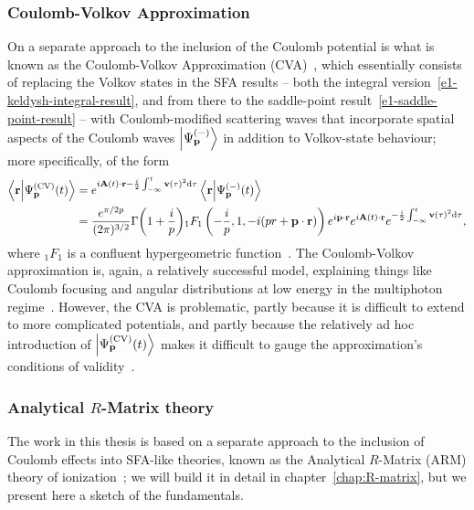 \subsubsection{Coulomb-Volkov Approximation}
On a separate approach to the inclusion of the Coulomb potential is what is known as the Coulomb-Volkov Approximation (CVA)~\cite{jain_coulomb-volkov_1978,cavaliere_coulomb-volkov_1980}, which essentially consists of replacing the Volkov states in the SFA results -- both the integral version~\eqref{e1-keldysh-integral-result}, and from there to the saddle-point result~\eqref{e1-saddle-point-result} -- with Coulomb-modified scattering waves that incorporate spatial aspects of the Coulomb waves $\ket{\Psi_{\vb{p}}^{(-)}}$ in addition to Volkov-state behaviour; more specifically, of the form
\begin{align}
\braket{\vb{r}}{\Psi_{\vb{p}}^\mathrm{(CV)}(t)}
& =
e^{i\vb{A}(t)\cdot\vb{r} - \frac i2\int_{-\infty}^t \vb{v}(\tau)^2\mathrm{d}\tau}
\braket{\vb{r}}{\Psi_{\vb{p}}^{(-)}(t)}
 \\ & = 
\frac{e^{\pi/2p}}{(2\pi)^{3/2}}
\Gamma\mathopen{}\left(1+\frac{i}{p}\right)\mathclose{}
{}_1F_1\left( -\frac{i}{p},1,-i(pr+\vb{p}\cdot\vb{r})\right)
e^{i\vb{p}\cdot\vb{r}}
e^{i\vb{A}(t)\cdot\vb{r}}
e^{-\frac i2\int_{-\infty}^t \vb{v}(\tau)^2\mathrm{d}\tau}
\nonumber
,
\end{align}
where ${}_1F_1$ is a confluent hypergeometric function~. The Coulomb-Volkov approximation is, again, a relatively successful model, explaining things like Coulomb focusing and angular distributions at low energy in the multiphoton regime~\cite{arbo_coulomb-volkov_2008}. However, the CVA is problematic, partly because it is difficult to extend to more complicated potentials, and partly because the relatively ad hoc introduction of $\ket{\Psi_{\vb{p}}^\mathrm{(CV)}(t)}$ makes it difficult to gauge the approximation's conditions of validity~\cite{ popruzhenko_Keldysh_theory}.







\subsubsection[Analytical R-Matrix theory]{Analytical $R$-Matrix theory}
The work in this thesis is based on a separate approach to the inclusion of Coulomb effects into SFA-like theories, known as the Analytical $R$-Matrix (ARM) theory of ionization~\cite{torlina_thesis, kaushal_thesis, ARM_initial, ARM_initial_multielectron}; we will build it in detail in chapter~\ref{chap:R-matrix}, but we present here a sketch of the fundamentals. 

